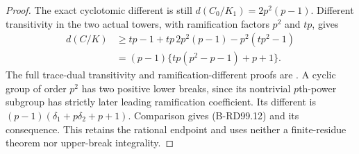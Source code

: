 \begin{proof}
The exact cyclotomic different is still
$d(C_0/K_1)=2p^2(p-1)$. Different transitivity in the two
actual towers, with ramification factors $p^2$ and $tp$,
gives
\[
\begin{split}
 d(C/K)&\ge tp-1+tp\,2p^2(p-1)-p^2(tp^2-1)\\
       &=(p-1)\{tp(p^2-p-1)+p+1\}.
\end{split}                                             \tag{B-RD99.14}
\]
The full trace-dual transitivity and ramification-different
proofs are \cite[Proposition3.17 and Corollary3.19,
pp.~17--18]{ColmezCorpsLocaux}. A cyclic group of order $p^2$
has two positive lower breaks, since its nontrivial $p$th-power
subgroup has strictly later leading ramification coefficient.
Its different is $(p-1)(\delta_1+p\delta_2+p+1)$.
Comparison gives (B-RD99.12) and its consequence. This retains
the rational endpoint and uses neither a finite-residue theorem
nor upper-break integrality.
\end{proof}


